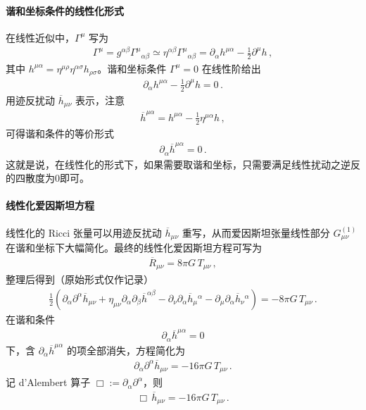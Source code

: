 \paragraph{谐和坐标条件的线性化形式}

在线性近似中，$\Gamma^{\mu}$ 写为
\begin{align}
\Gamma^{\mu}
=
g^{\alpha\beta}\Gamma^{\mu}{}_{\alpha\beta}
\simeq
\eta^{\alpha\beta}\Gamma^{\mu}{}_{\alpha\beta}
=
\partial_{\alpha}h^{\mu\alpha}
-
\frac{1}{2}\partial^{\mu}h\,,
\end{align}
其中 $h^{\mu\alpha}=\eta^{\mu\rho}\eta^{\alpha\sigma}h_{\rho\sigma}$。谐和坐标条件 $\Gamma^{\mu}=0$ 在线性阶给出
\begin{align}
\partial_{\alpha}h^{\mu\alpha}
-
\frac{1}{2}\partial^{\mu}h
=0\,.
\end{align}
用迹反扰动 $\overline{h}_{\mu\nu}$ 表示，注意
\begin{align}
\overline{h}^{\mu\alpha}
=
h^{\mu\alpha}
-
\frac{1}{2}\eta^{\mu\alpha}h\,,
\end{align}
可得谐和条件的等价形式
\begin{align}
\partial_{\alpha}\overline{h}^{\mu\alpha} = 0\,.
\end{align}
这就是说，在线性化的形式下，如果需要取谐和坐标，只需要满足线性扰动之逆反的四散度为0即可。
\paragraph{线性化爱因斯坦方程}

线性化的 Ricci 张量可以用迹反扰动 $\overline{h}_{\mu\nu}$ 重写，从而爱因斯坦张量线性部分 $G^{(1)}_{\mu\nu}$ 在谐和坐标下大幅简化。最终的线性化爱因斯坦方程可写为
\begin{align}
\overline{R}_{\mu\nu}
=
8\pi G\,T_{\mu\nu}\,,
\end{align}
整理后得到（原始形式仅作记录）
\begin{align}
\frac{1}{2}
\left(
  \partial_{\alpha}\partial^{\alpha}\overline{h}_{\mu\nu}
  +
  \eta_{\mu\nu}\partial_{\alpha}\partial_{\beta}\overline{h}^{\alpha\beta}
  -
  \partial_{\nu}\partial_{\alpha}\overline{h}_{\mu}{}^{\alpha}
  -
  \partial_{\mu}\partial_{\alpha}\overline{h}_{\nu}{}^{\alpha}
\right)
=
-8\pi G\,T_{\mu\nu}\,.
\end{align}
在谐和条件
\begin{align}
\partial_{\alpha}\overline{h}^{\mu\alpha}=0
\end{align}
下，含 $\partial_{\alpha}\overline{h}^{\mu\alpha}$ 的项全部消失，方程简化为
\begin{align}
\partial_{\alpha}\partial^{\alpha}\overline{h}_{\mu\nu}
=
-16\pi G\,T_{\mu\nu}\,.
\end{align}
记 d'Alembert 算子 $\Box := \partial_{\alpha}\partial^{\alpha}$，则
\begin{align}
\Box\,\overline{h}_{\mu\nu}
=
-16\pi G\,T_{\mu\nu}\,.
\end{align}

